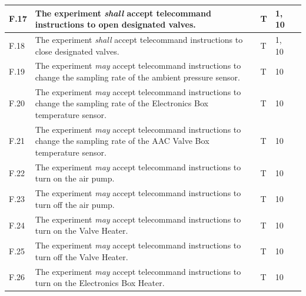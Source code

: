 \documentclass[a4paper,12pt,twoside]{article}
\begin{document}
\begin{longtable}[]{|m{}| m{} |m{} |m{}|m{}|}
F.17 & The experiment \textit{shall} accept telecommand instructions to open designated valves.                                                                                         &      T        & 1, 10            &        \\ \hline
F.18 & The experiment \textit{shall} accept telecommand instructions to close designated valves.                                                                                        &      T        & 1, 10            &        \\ \hline
F.19 & The experiment \textit{may} accept telecommand instructions to change the sampling rate of the ambient pressure sensor.                                                          &     T         & 10            &        \\ \hline
F.20 & The experiment \textit{may} accept telecommand instructions to change the sampling rate of the Electronics Box temperature sensor.                                                       &      T        & 10            &        \\ \hline
F.21 & The experiment \textit{may} accept telecommand instructions to change the sampling rate of the AAC Valve Box temperature sensor.                                                 &      T        & 10            &        \\ \hline
F.22 & The experiment \textit{may} accept telecommand instructions to turn on the air pump.                                                                                             &      T        & 10            &        \\ \hline
F.23 & The experiment \textit{may} accept telecommand instructions to turn off the air pump.                                                                                            &       T       & 10            &        \\ \hline
F.24 & The experiment \textit{may} accept telecommand instructions to turn on the Valve Heater.                                                                                         &      T        & 10            &        \\ \hline
F.25 & The experiment \textit{may} accept telecommand instructions to turn off the Valve Heater.                                                                                        &      T        & 10            &        \\ \hline
F.26 & The experiment \textit{may} accept telecommand instructions to turn on the Electronics Box Heater.                                                                                    &      T        & 10            &        \\ \hline

\end{longtable}
\end{document}
